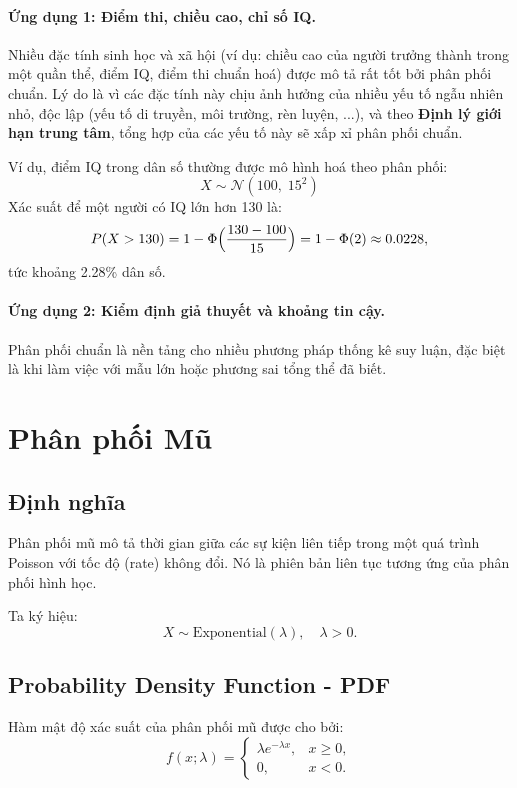 \paragraph{Ứng dụng 1: Điểm thi, chiều cao, chỉ số IQ.}  
Nhiều đặc tính sinh học và xã hội (ví dụ: chiều cao của người trưởng thành trong một quần thể, điểm IQ, điểm thi chuẩn hoá) được mô tả rất tốt bởi phân phối chuẩn.  
Lý do là vì các đặc tính này chịu ảnh hưởng của nhiều yếu tố ngẫu nhiên nhỏ, độc lập (yếu tố di truyền, môi trường, rèn luyện, ...), và theo \textbf{Định lý giới hạn trung tâm}, tổng hợp của các yếu tố này sẽ xấp xỉ phân phối chuẩn.

Ví dụ, điểm IQ trong dân số thường được mô hình hoá theo phân phối:
\[
X \sim \mathcal{N}(100,\;15^2)
\]
Xác suất để một người có IQ lớn hơn 130 là:
\[
P(X > 130) = 1 - \Phi\Bigl(\frac{130 - 100}{15}\Bigr) 
= 1 - \Phi(2) \approx 0.0228,
\]
tức khoảng 2.28\% dân số.

\paragraph{Ứng dụng 2: Kiểm định giả thuyết và khoảng tin cậy.}  
Phân phối chuẩn là nền tảng cho nhiều phương pháp thống kê suy luận, đặc biệt là khi làm việc với mẫu lớn hoặc phương sai tổng thể đã biết.  


\section{Phân phối Mũ}

\subsection{Định nghĩa}

Phân phối mũ mô tả thời gian giữa các sự kiện liên tiếp trong một quá trình Poisson với tốc độ (rate) không đổi.  
Nó là phiên bản liên tục tương ứng của phân phối hình học.  

Ta ký hiệu:
\[
X \sim \mathrm{Exponential}(\lambda), \quad \lambda>0.
\]

\subsection{Probability Density Function - PDF}

Hàm mật độ xác suất của phân phối mũ được cho bởi:
\[
f(x;\lambda) = 
\begin{cases}
\lambda e^{-\lambda x}, & x \ge 0, \\
0, & x < 0.
\end{cases}
\]

